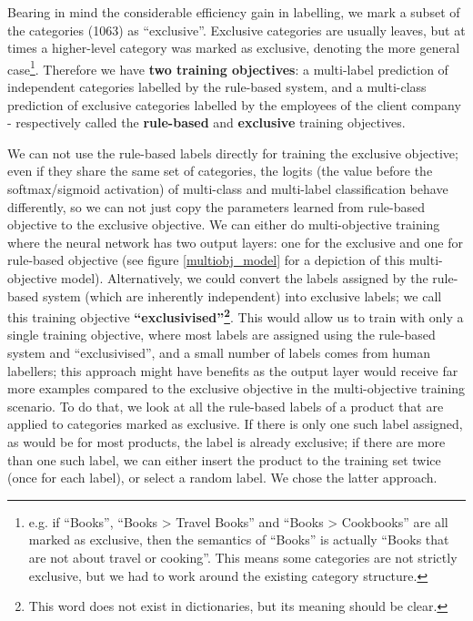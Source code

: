 Bearing in mind the considerable efficiency gain in labelling, we mark a subset of the categories (1063) as ``exclusive''.
Exclusive categories are usually leaves, but at times a higher-level category was marked as exclusive, denoting the more general case\footnote{e.g. if ``Books'', ``Books > Travel Books'' and ``Books > Cookbooks'' are all marked as exclusive, then the semantics of ``Books'' is actually ``Books that are not about travel or cooking''. This means some categories are not strictly exclusive, but we had to work around the existing category structure.}.
Therefore we have \textbf{two training objectives}: a multi-label prediction of independent categories labelled by the rule-based system, and a multi-class prediction of exclusive categories labelled by the employees of the client company - respectively called the \textbf{rule-based} and \textbf{exclusive} training objectives.

We can not use the rule-based labels directly for training the exclusive objective; even if they share the same set of categories, the logits (the value before the softmax/sigmoid activation) of multi-class and multi-label classification behave differently, so we can not just copy the parameters learned from rule-based objective to the exclusive objective.
We can either do multi-objective training where the neural network has two output layers: one for the exclusive and one for rule-based objective (see figure \ref{multiobj_model} for a depiction of this multi-objective model).
Alternatively, we could convert the labels assigned by the rule-based system (which are inherently independent) into exclusive labels; we call this training objective \textbf{``exclusivised''\footnote{This word does not exist in dictionaries, but its meaning should be clear.}}.
This would allow us to train with only a single training objective, where most labels are assigned using the rule-based system and ``exclusivised'', and a small number of labels comes from human labellers; this approach might have benefits as the output layer would receive far more examples compared to the exclusive objective in the multi-objective training scenario.
To do that, we look at all the rule-based labels of a product that are applied to categories marked as exclusive.
If there is only one such label assigned, as would be for most products, the label is already exclusive; if there are more than one such label, we can either insert the product to the training set twice (once for each label), or select a random label.
We chose the latter approach.



